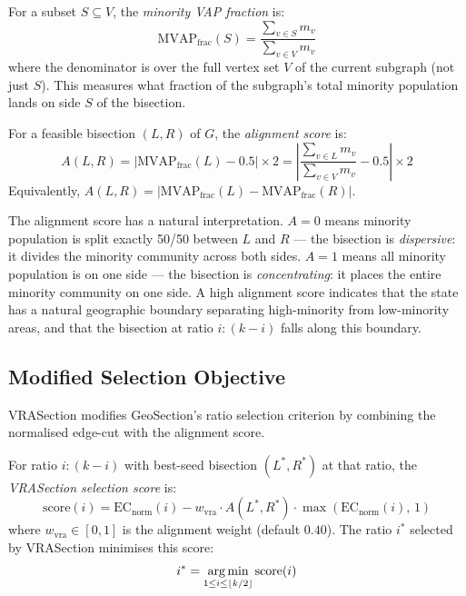 \begin{definition}
For a subset $S \subseteq V$, the \emph{minority VAP fraction} is:
\[
  \mathrm{MVAP}_\text{frac}(S) = \frac{\sum_{v \in S} m_v}{\sum_{v \in V} m_v}
\]
where the denominator is over the full vertex set $V$ of the current subgraph
(not just $S$). This measures what fraction of the subgraph's total minority
population lands on side $S$ of the bisection.
\end{definition}

\begin{definition}
\label{def:alignment}
For a feasible bisection $(L, R)$ of $G$, the \emph{alignment score} is:
\[
  A(L, R) = \left|\mathrm{MVAP}_\text{frac}(L) - 0.5\right| \times 2
           = \left|\frac{\sum_{v \in L} m_v}{\sum_{v \in V} m_v} - 0.5\right| \times 2
\]
Equivalently, $A(L,R) = |\mathrm{MVAP}_\text{frac}(L) - \mathrm{MVAP}_\text{frac}(R)|$.
\end{definition}

The alignment score has a natural interpretation.
$A = 0$ means minority population is split exactly 50/50 between $L$ and $R$
--- the bisection is \emph{dispersive}: it divides the minority community
across both sides.
$A = 1$ means all minority population is on one side --- the bisection is
\emph{concentrating}: it places the entire minority community on one side.
A high alignment score indicates that the state has a natural geographic
boundary separating high-minority from low-minority areas, and that the
bisection at ratio $i:(k-i)$ falls along this boundary.

\subsection{Modified Selection Objective}

VRASection modifies GeoSection's ratio selection criterion by combining
the normalised edge-cut with the alignment score.

\begin{definition}
\label{def:selection-score}
For ratio $i:(k-i)$ with best-seed bisection $(L^*, R^*)$ at that ratio, the
\emph{VRASection selection score} is:
\[
  \mathrm{score}(i) = \mathrm{EC}_\text{norm}(i)
  - w_\text{vra} \cdot A(L^*, R^*)
    \cdot \max\!\left(\mathrm{EC}_\text{norm}(i),\, 1\right)
\]
where $w_\text{vra} \in [0, 1]$ is the alignment weight (default $0.40$).
The ratio $i^*$ selected by VRASection minimises this score:
\[
  i^* = \operatorname*{arg\,min}_{1 \leq i \leq \lfloor k/2 \rfloor} \mathrm{score}(i)
\]
\end{definition}

